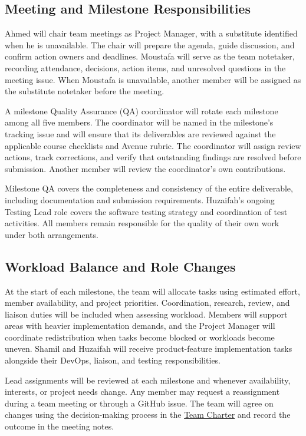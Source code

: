\documentclass{article}
\begin{document}
\subsection{Meeting and Milestone Responsibilities}
\label{sec:meeting-milestone-responsibilities}

Ahmed will chair team meetings as Project Manager, with a substitute
identified when he is unavailable. The chair will prepare the agenda,
guide discussion, and confirm action owners and deadlines.
Moustafa will serve as the team notetaker, recording attendance,
decisions, action items, and unresolved questions in the meeting
issue. When Moustafa is unavailable, another member will be
assigned as the substitute notetaker before the meeting.

A milestone Quality Assurance (QA) coordinator will rotate each
milestone among all five members. The coordinator will be named in the
milestone's tracking issue and will ensure that its deliverables are
reviewed against the applicable course checklists and Avenue rubric.
The coordinator will assign review actions, track corrections, and
verify that outstanding findings are resolved before submission.
Another member will review the coordinator's own contributions.

Milestone QA covers the completeness and consistency of the entire
deliverable, including documentation and submission requirements.
Huzaifah's ongoing Testing Lead role covers the software testing
strategy and coordination of test activities. All members remain
responsible for the quality of their own work under both arrangements.

\subsection{Workload Balance and Role Changes}
\label{sec:workload-role-changes}

At the start of each milestone, the team will allocate tasks using
estimated effort, member availability, and project priorities.
Coordination, research, review, and liaison duties will be included
when assessing workload. Members will support areas with heavier
implementation demands, and the Project Manager will coordinate
redistribution when tasks become blocked or workloads become uneven.
Shamil and Huzaifah will receive product-feature implementation tasks
alongside their DevOps, liaison, and testing responsibilities.

Lead assignments will be reviewed at each milestone and whenever
availability, interests, or project needs change. Any member may
request a reassignment during a team meeting or through a GitHub issue.
The team will agree on changes using the decision-making process
in the \hyperlink{app:team-charter}{Team Charter} and record the
outcome in the meeting notes.
\end{document}

